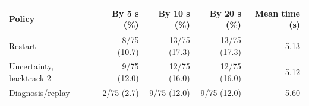 \begin{tabular}{@{}lrrrr@{}}
\toprule
Policy & By 5 s (\%) & By 10 s (\%) & By 20 s (\%) & Mean time (s) \\
\midrule
Restart & 8/75 (10.7) & 13/75 (17.3) & 13/75 (17.3) & 5.13 \\
Uncertainty, backtrack 2 & 9/75 (12.0) & 12/75 (16.0) & 12/75 (16.0) & 5.12 \\
Diagnosis/replay & 2/75 (2.7) & 9/75 (12.0) & 9/75 (12.0) & 5.60 \\
\bottomrule
\end{tabular}
